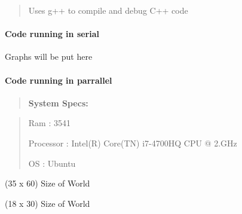 \begin{quote}

\begin{DoxyItemize}
\item Uses g++ to compile and debug C++ code 
\end{DoxyItemize}\end{quote}


\paragraph*{{\itshape } Code running in serial}

Graphs will be put here

\paragraph*{{\itshape } Code running in parrallel}

\begin{quote}
{\bfseries System Specs\+:} \end{quote}


\begin{quote}

\begin{DoxyItemize}
\item Ram \+: 3541
\item Processor \+: Intel(\+R) Core(\+T\+N) i7-\/4700\+HQ C\+PU @ 2.\+G\+Hz
\item OS \+: Ubuntu 
\end{DoxyItemize}\end{quote}


(35 x 60) Size of World



(18 x 30) Size of World

 